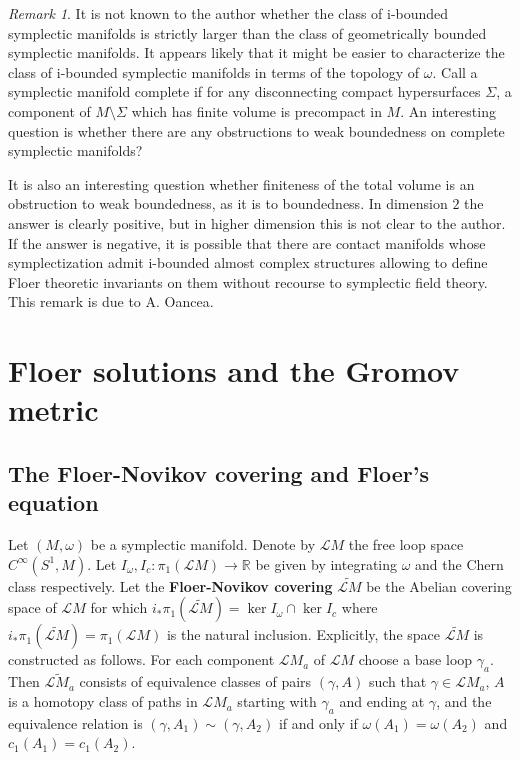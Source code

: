 \documentclass[11pt]{amsart}
\newcommand{\R}{\mathbb{R}}
\theoremstyle{definition}
\theoremstyle{remark}
\newtheorem{rem}[tm]{Remark}
\begin{document}
\begin{rem}
It is not known to the author whether the class of i-bounded symplectic manifolds is strictly larger than the class of geometrically bounded symplectic manifolds. It appears likely that it might be easier to characterize the class of i-bounded symplectic manifolds in terms of the topology of $\omega$. Call a symplectic manifold complete if for any disconnecting compact hypersurfaces $\Sigma$, a component of $M\setminus \Sigma$ which has finite volume is precompact in $M$. An interesting question is whether there are any obstructions to weak boundedness on complete symplectic manifolds?

It is also an interesting question whether finiteness of the total volume is an obstruction to weak boundedness, as it is to boundedness. In dimension $2$ the answer is clearly positive, but in higher dimension this is not clear to the author. If the answer is negative, it is possible that there are contact manifolds whose symplectization admit i-bounded almost complex structures allowing to define Floer theoretic invariants on them without recourse to symplectic field theory. This remark is due to A. Oancea.
\end{rem}
\section{Floer solutions and the Gromov metric}\label{Sec3}
\subsection{The Floer-Novikov covering and Floer's equation}\label{SecFloerGrom}
Let $(M,\omega)$ be a symplectic manifold. Denote by $\mathcal{L}M$ the free loop space $C^{\infty}(S^1,M)$.  Let $I_{\omega},I_c:\pi_1(\mathcal{L}M)\to\R$ be given by integrating $\omega$ and the Chern class respectively. Let the \textbf{Floer-Novikov covering} $\widetilde{\mathcal{L}M}$ be the Abelian covering space of $\mathcal{L}M$ for which $i_*\pi_1(\widetilde{\mathcal{L}M})=\ker I_\omega\cap \ker I_c$ where $i_*\pi_1(\widetilde{\mathcal{L}M})=\pi_1(\mathcal{L}M)$ is the natural inclusion. Explicitly, the space $\widetilde{\mathcal{L}M}$ is constructed as follows. For each component $\mathcal{L}M_a$ of $\mathcal{L}M$ choose a base loop $\gamma_a$. Then $\widetilde{\mathcal{L}M_a}$  consists of equivalence classes of pairs $(\gamma,A)$ such that $\gamma\in\mathcal{L}M_a$, $A$ is a homotopy class of paths in $\mathcal{L}M_a$ starting with $\gamma_a$ and ending at $\gamma$, and the equivalence relation is $(\gamma,A_1)\sim(\gamma,A_2)$ if and only if $\omega(A_1)=\omega(A_2)$ and $c_1(A_1)=c_1(A_2).$
\end{document}
